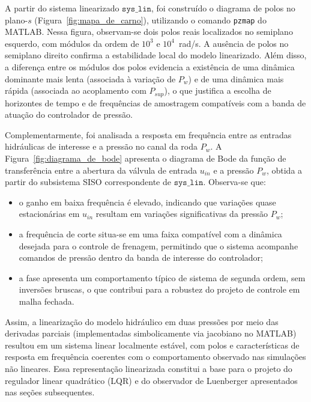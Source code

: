 A partir do sistema linearizado $\texttt{sys\_lin}$, foi construído o diagrama de polos no plano-$s$ (Figura~\ref{fig:mapa_de_carno}), utilizando o comando \texttt{pzmap} do MATLAB. Nessa figura, observam-se dois polos reais localizados no semiplano esquerdo, com módulos da ordem de $10^{3}$ e $10^{4}$~rad/s. A ausência de polos no semiplano direito confirma a estabilidade local do modelo linearizado. Além disso, a diferença entre os módulos dos polos evidencia a existência de uma dinâmica dominante mais lenta (associada à variação de $P_w$) e de uma dinâmica mais rápida (associada ao acoplamento com $P_{sup}$), o que justifica a escolha de horizontes de tempo e de frequências de amostragem compatíveis com a banda de atuação do controlador de pressão.

Complementarmente, foi analisada a resposta em frequência entre as entradas hidráulicas de interesse e a pressão no canal da roda $P_w$. A Figura~\ref{fig:diagrama_de_bode} apresenta o diagrama de Bode da função de transferência entre a abertura da válvula de entrada $u_{in}$ e a pressão $P_w$, obtida a partir do subsistema SISO correspondente de $\texttt{sys\_lin}$. Observa-se que:
\begin{itemize}
    \item o ganho em baixa frequência é elevado, indicando que variações quase estacionárias em $u_{in}$ resultam em variações significativas da pressão $P_w$;
    \item a frequência de corte situa-se em uma faixa compatível com a dinâmica desejada para o controle de frenagem, permitindo que o sistema acompanhe comandos de pressão dentro da banda de interesse do controlador;
    \item a fase apresenta um comportamento típico de sistema de segunda ordem, sem inversões bruscas, o que contribui para a robustez do projeto de controle em malha fechada.
\end{itemize}

Assim, a linearização do modelo hidráulico em duas pressões por meio das derivadas parciais (implementadas simbolicamente via jacobiano no MATLAB) resultou em um sistema linear localmente estável, com polos e características de resposta em frequência coerentes com o comportamento observado nas simulações não lineares. Essa representação linearizada constitui a base para o projeto do regulador linear quadrático (LQR) e do observador de Luenberger apresentados nas seções subsequentes.


